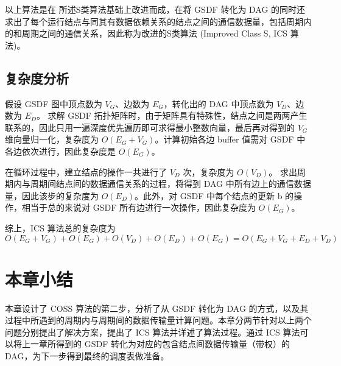 以上算法是在 \cite{SDF1987} 所述S类算法基础上改进而成，在将 GSDF 转化为 DAG 的同时还求出了每个运行结点与同其有数据依赖关系的结点之间的通信数据量，包括周期内的和周期之间的通信关系，因此称为改进的S类算法 (Improved Class S, ICS 算法)。

\subsection{复杂度分析}
假设 GSDF 图中顶点数为 $V_G$、边数为 $E_G$，转化出的 DAG 中顶点数为 $V_D$、边数为 $E_D$。
求解 GSDF 拓扑矩阵时，由于矩阵具有特殊性，结点之间是两两产生联系的，因此只用一遍深度优先遍历即可求得最小整数向量，最后再对得到的 $V_G$ 维向量归一化，复杂度为 $O(E_G+V_G)$。计算初始各边 buffer 值需对 GSDF 中各边依次进行，因此复杂度是 $O(E_G)$。

在循环过程中，建立结点的操作一共进行了 $V_D$ 次，复杂度为 $O(V_D)$。
求出周期内与周期间结点间的数据通信关系的过程，将得到 DAG 中所有边上的通信数据量，因此该步的复杂度为 $O(E_D)$。此外，对 GSDF 中每个结点的更新 b 的操作，相当于总的来说对 GSDF 所有边进行一次操作，因此复杂度为 $O(E_G)$。

综上，ICS 算法总的复杂度为 $$O(E_G+V_G)+O(E_G)+O(V_D)+O(E_D)+O(E_G)=O(E_G+V_G+E_D+V_D)$$



\section{本章小结}

本章设计了 COSS 算法的第二步，分析了从 GSDF 转化为 DAG 的方式，以及其过程中所遇到的周期内与周期间的数据传输量计算问题。本章分两节针对以上两个问题分别提出了解决方案，提出了 ICS 算法并详述了算法过程。通过 ICS 算法可以将上一章所得到的 GSDF 转化为对应的包含结点间数据传输量（带权）的DAG，为下一步得到最终的调度表做准备。

